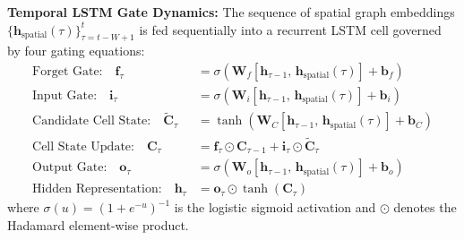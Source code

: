 \textbf{Temporal LSTM Gate Dynamics:} The sequence of spatial graph embeddings $\{\mathbf{h}_{\text{spatial}}(\tau)\}_{\tau=t-W+1}^{t}$ is fed sequentially into a recurrent LSTM cell governed by four gating equations:
\begin{align}
\text{Forget Gate:} \quad \mathbf{f}_\tau &= \sigma\left( \mathbf{W}_f \left[ \mathbf{h}_{\tau-1}, \, \mathbf{h}_{\text{spatial}}(\tau) \right] + \mathbf{b}_f \right) \label{eq:lstm_f} \\
\text{Input Gate:} \quad \mathbf{i}_\tau &= \sigma\left( \mathbf{W}_i \left[ \mathbf{h}_{\tau-1}, \, \mathbf{h}_{\text{spatial}}(\tau) \right] + \mathbf{b}_i \right) \label{eq:lstm_i} \\
\text{Candidate Cell State:} \quad \tilde{\mathbf{C}}_\tau &= \tanh\left( \mathbf{W}_C \left[ \mathbf{h}_{\tau-1}, \, \mathbf{h}_{\text{spatial}}(\tau) \right] + \mathbf{b}_C \right) \label{eq:lstm_c_tilde} \\
\text{Cell State Update:} \quad \mathbf{C}_\tau &= \mathbf{f}_\tau \odot \mathbf{C}_{\tau-1} + \mathbf{i}_\tau \odot \tilde{\mathbf{C}}_\tau \label{eq:lstm_c} \\
\text{Output Gate:} \quad \mathbf{o}_\tau &= \sigma\left( \mathbf{W}_o \left[ \mathbf{h}_{\tau-1}, \, \mathbf{h}_{\text{spatial}}(\tau) \right] + \mathbf{b}_o \right) \label{eq:lstm_o} \\
\text{Hidden Representation:} \quad \mathbf{h}_\tau &= \mathbf{o}_\tau \odot \tanh(\mathbf{C}_\tau) \label{eq:lstm_h}
\end{align}
where $\sigma(u) = (1 + e^{-u})^{-1}$ is the logistic sigmoid activation and $\odot$ denotes the Hadamard element-wise product.

